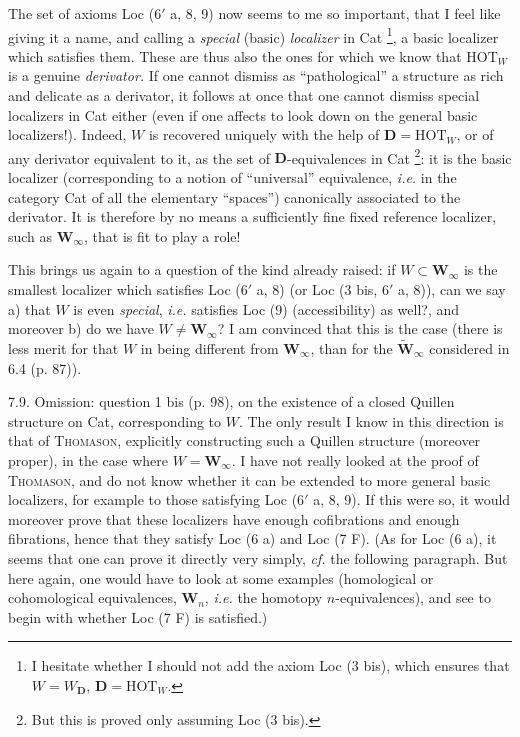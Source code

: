 \documentclass[11pt]{article}
\newcommand{\printedpage}[1]{\marginpar{\footnotesize p.~#1}}
\newcommand{\msp}[1]{\marginpar{\footnotesize [#1]}}
\begin{document}
The set of axioms Loc (6$'$ a, 8, 9) now seems to me so important, that I feel like giving it a name, and calling a \textit{special} (basic) \textit{localizer} in Cat \footnote[57]{I hesitate whether I should not add the axiom Loc (3 bis), which ensures that $W=W_{\mathbf{D}}$, $\mathbf{D}=\mathrm{HOT}_W$.}, a basic localizer which satisfies them. These are thus also the ones for which we know that $\mathrm{HOT}_W$ is a genuine \textit{derivator.} If one cannot dismiss as ``pathological'' a structure as rich and delicate as a derivator, it follows at once that one cannot dismiss special localizers in Cat either (even if one affects to look down on the
\msp{page 122}
general basic localizers!). Indeed, $W$ is recovered uniquely with the help of $\mathbf{D}=\mathrm{HOT}_W$, or of any derivator equivalent to it, as the set of $\mathbf{D}$-equivalences in Cat \footnote[58]{But this is proved only assuming Loc (3 bis).}: it is the basic localizer (corresponding to a notion of ``universal'' equivalence, \textit{i.e.} in the category Cat of all the elementary ``spaces'') canonically associated to the derivator. It is therefore by no means a sufficiently fine fixed reference localizer, such as $\mathbf{W}_\infty$, that is fit to play a role!

This brings us again to a question of the kind already raised: if $W\subset\mathbf{W}_\infty$ is the smallest localizer which satisfies Loc (6$'$ a, 8) (or Loc (3 bis, 6$'$ a, 8)), can we say a) that $W$ is even \textit{special}, \textit{i.e.}
\msp{page 123}
satisfies Loc (9) (accessibility) as well?, and moreover b) do we have $W\neq\mathbf{W}_\infty$? I am convinced that this is the case (there is less merit for that $W$ in being different from $\mathbf{W}_\infty$,
\printedpage{57}
than for the $\tilde{\mathbf{W}}_\infty$ considered in 6.4 (p. 87)).

7.9. Omission: question 1 bis (p. 98), on the existence of a closed Quillen structure on Cat, corresponding to $W$. The only result I know in this direction is that of \textsc{Thomason}, explicitly constructing such a Quillen structure (moreover proper), in the case where $W=\mathbf{W}_\infty$. I have not really looked at the proof of \textsc{Thomason}, and do not know whether it can be extended to more general basic localizers, for example to those satisfying Loc (6$'$ a, 8, 9). If this were so, it would moreover prove that these localizers
\msp{page 124}
have enough cofibrations and enough fibrations, hence that they satisfy Loc (6 a) and Loc (7 F). (As for Loc (6 a), it seems that one can prove it directly very simply, \textit{cf.} the following paragraph. But here again, one would have to look at some examples (homological or cohomological equivalences, $\mathbf{W}_n$, \textit{i.e.} the homotopy $n$-equivalences), and see to begin with whether Loc (7 F) is satisfied.)
\end{document}

